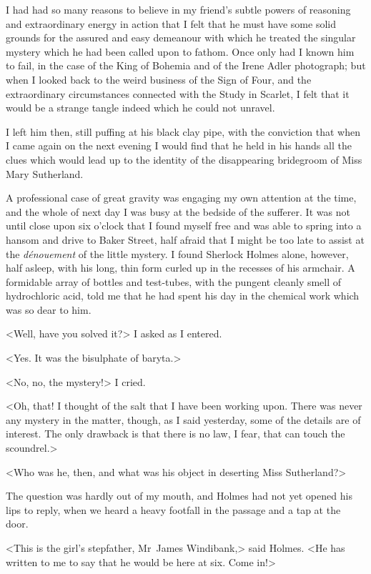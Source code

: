 I had had so many reasons to believe in my friend's subtle powers of reasoning and extraordinary energy in action that I felt that he must have some solid grounds for the assured and easy demeanour with which he treated the singular mystery which he had been called upon to fathom. Once only had I known him to fail, in the case of the King of Bohemia and of the Irene Adler photograph; but when I looked back to the weird business of the Sign of Four, and the extraordinary circumstances connected with the Study in Scarlet, I felt that it would be a strange tangle indeed which he could not unravel.

I left him then, still puffing at his black clay pipe, with the conviction that when I came again on the next evening I would find that he held in his hands all the clues which would lead up to the identity of the disappearing bridegroom of Miss Mary Sutherland.

A professional case of great gravity was engaging my own attention at the time, and the whole of next day I was busy at the bedside of the sufferer. It was not until close upon six o'clock that I found myself free and was able to spring into a hansom and drive to Baker Street, half afraid that I might be too late to assist at the \textit{dénouement} of the little mystery. I found Sherlock Holmes alone, however, half asleep, with his long, thin form curled up in the recesses of his armchair. A formidable array of bottles and test-tubes, with the pungent cleanly smell of hydrochloric acid, told me that he had spent his day in the chemical work which was so dear to him.

<Well, have you solved it?> I asked as I entered.

<Yes. It was the bisulphate of baryta.>

<No, no, the mystery!> I cried.

<Oh, that! I thought of the salt that I have been working upon. There was never any mystery in the matter, though, as I said yesterday, some of the details are of interest. The only drawback is that there is no law, I fear, that can touch the scoundrel.>

<Who was he, then, and what was his object in deserting Miss Sutherland?>

The question was hardly out of my mouth, and Holmes had not yet opened his lips to reply, when we heard a heavy footfall in the passage and a tap at the door.

<This is the girl's stepfather, Mr~James Windibank,> said Holmes. <He has written to me to say that he would be here at six. Come in!>

